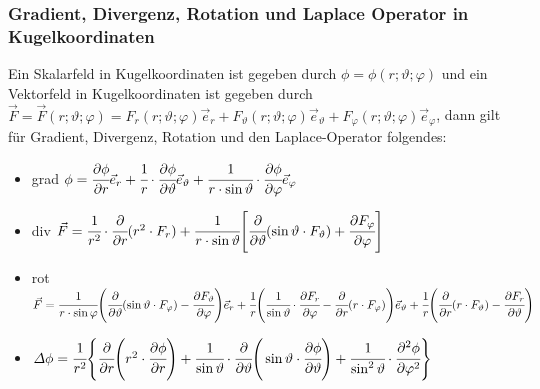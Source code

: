 \documentclass[a4paper,10pt]{scrartcl}
\begin{document}
            \subsubsection{Gradient, Divergenz, Rotation und Laplace Operator in Kugelkoordinaten}
            Ein Skalarfeld in Kugelkoordinaten ist gegeben durch \(\phi = \phi(r; \vartheta; \varphi)\) und ein Vektorfeld in Kugelkoordinaten ist gegeben durch \(\vec{F} =
            \vec{F}(r; \vartheta; \varphi) = F_r(r; \vartheta; \varphi)\vec{e}_r + F_\vartheta(r; \vartheta; \varphi)\vec{e}_\vartheta + F_\varphi(r; \vartheta; \varphi)\vec{e}_\varphi \), dann gilt für Gradient, Divergenz, Rotation und 
            den Laplace-Operator folgendes: 
            \begin{itemize}
                \item grad \(\phi = \cfrac{\partial \phi}{\partial r}\vec{e}_r + \cfrac{1}{r} \cdot \cfrac{\partial \phi}{\partial \vartheta}\vec{e}_\vartheta + \cfrac{1}{r \cdot \sin \vartheta} \cdot \cfrac{\partial \phi}{\partial \varphi}\vec{e}_\varphi\)  
                \item div \(\vec{F} = \cfrac{1}{r^2} \cdot \cfrac{\partial}{\partial r} (r^2 \cdot F_r) + \cfrac{1}{r \cdot \sin \vartheta} \Bigg[  \cfrac{\partial}{\partial \vartheta} (\sin \vartheta \cdot F_\vartheta) + \cfrac{\partial F_\varphi}{\partial \varphi} \Bigg] \)
                \item rot \(\vec{F} = \cfrac{1}{r \cdot \sin \varphi} \Bigg(  \cfrac{\partial}{\partial \vartheta}(\sin \vartheta \cdot F_\varphi) - \cfrac{\partial F_\vartheta}{\partial \varphi}  \Bigg)\vec{e}_r +
                \cfrac{1}{r} \Bigg(  \cfrac{1}{\sin \vartheta} \cdot \cfrac{\partial F_r}{\partial \varphi} - \cfrac{\partial}{\partial r}(r \cdot F_\varphi) \Bigg) \vec{e}_\vartheta + 
                \cfrac{1}{r} \Bigg(   \cfrac{\partial}{\partial r}(r \cdot F_\vartheta) - \cfrac{\partial F_r}{\partial \vartheta}  \Bigg)  \)
                \item \(\varDelta \phi = \cfrac{1}{r^2}\Bigg\{  \cfrac{\partial}{\partial r} \Bigg( r^2 \cdot \cfrac{\partial \phi}{\partial r}  \Bigg) + \cfrac{1}{\sin \vartheta} \cdot 
                \cfrac{\partial}{\partial \vartheta} \Bigg(  \sin \vartheta \cdot \cfrac{\partial \phi}{\partial \vartheta}  \Bigg)  + \cfrac{1}{\sin^2 \vartheta} \cdot \cfrac{\partial^2 \phi}{\partial \varphi^2}  \Bigg \}\)
            \end{itemize}
\end{document}
